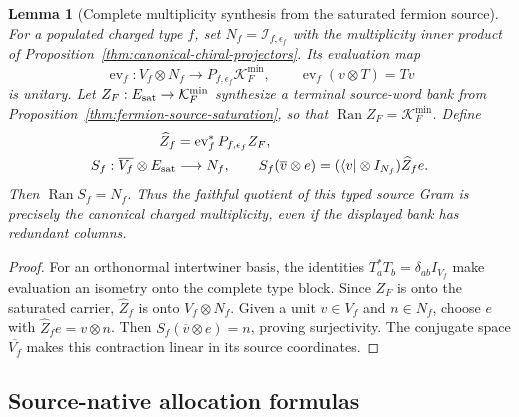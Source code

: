 \documentclass[11pt]{article}
\numberwithin{equation}{section}
\newtheorem{lemma}[theorem]{Lemma}
\theoremstyle{definition}
\theoremstyle{remark}
\newcommand{\Ran}{\operatorname{Ran}}
\begin{document}
\begin{lemma}[Complete multiplicity synthesis from the saturated fermion source]
\label{lem:complete-typed-source}
For a populated charged type $f$, set
$N_f=\mathcal I_{f,\epsilon_f}$ with the multiplicity inner product of
Proposition~\ref{thm:canonical-chiral-projectors}.  Its evaluation map
\[
 \operatorname{ev}_f:V_f\otimes N_f
 \longrightarrow P_{f,\epsilon_f}\mathcal K_F^{\min},\qquad
 \operatorname{ev}_f(v\otimes T)=Tv
\]
is unitary.  Let $Z_F:E_{\rm sat}\to\mathcal K_F^{\min}$ synthesize a
terminal source-word bank from
Proposition~\ref{thm:fermion-source-saturation}, so that
$\Ran Z_F=\mathcal K_F^{\min}$.  Define
\begin{equation}
 \begin{split}
 \widehat Z_f&=\operatorname{ev}_f^*P_{f,\epsilon_f}Z_F,\\
 S_f:\overline{V_f}\otimes E_{\rm sat}&\longrightarrow N_f,\qquad
 S_f(\overline v\otimes e)
       =(\langle v|\otimes I_{N_f})\widehat Z_fe.
 \end{split}
 \label{eq:complete-typed-source-synthesis}
\end{equation}
Then $\Ran S_f=N_f$.  Thus the faithful quotient of this typed source Gram
is precisely the canonical charged multiplicity, even if the displayed bank
has redundant columns.
\end{lemma}

\begin{proof}
For an orthonormal intertwiner basis, the identities
$T_a^*T_b=\delta_{ab}I_{V_f}$ make evaluation an isometry onto the complete
type block.  Since $Z_F$ is onto the saturated carrier, $\widehat Z_f$ is onto
$V_f\otimes N_f$.  Given a unit $v\in V_f$ and $n\in N_f$, choose $e$ with
$\widehat Z_fe=v\otimes n$.  Then
$S_f(\overline v\otimes e)=n$, proving surjectivity.  The conjugate space
$\overline{V_f}$ makes this contraction linear in its source coordinates.
\end{proof}


\subsection{Source-native allocation formulas}
\end{document}

